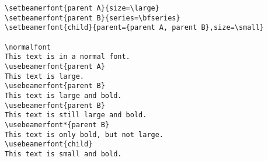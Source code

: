 \begin{command}{\setbeamerfont\opt{|*|}}
  \example
\begin{verbatim}
\setbeamerfont{parent A}{size=\large}
\setbeamerfont{parent B}{series=\bfseries}
\setbeamerfont{child}{parent={parent A, parent B},size=\small}

\normalfont
This text is in a normal font.
\usebeamerfont{parent A}
This text is large.
\usebeamerfont{parent B}
This text is large and bold.
\usebeamerfont{parent B}
This text is still large and bold.
\usebeamerfont*{parent B}
This text is only bold, but not large.
\usebeamerfont{child}
This text is small and bold.
\end{verbatim}
\end{command}
